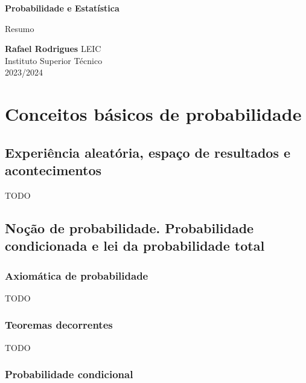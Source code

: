 \documentclass[11pt, a4paper]{article}
\begin{document}
\begin{titlepage}
    \begin{center}
        \vspace*{1cm}

        \textbf{\LARGE Probabilidade e Estatística}
        \vspace{0.5cm}

        \Large Resumo
        \vspace{1.5cm}

        \textbf{Rafael Rodrigues}
        \vfill
        LEIC \\
        Instituto Superior Técnico \\
        2023/2024
    \end{center}
\end{titlepage}

\tableofcontents

\setcounter{section}{1}

\newpage
\section{Conceitos básicos de probabilidade}


\subsection{Experiência aleatória, espaço de resultados e acontecimentos}

TODO

\subsection{Noção de probabilidade. Probabilidade condicionada e lei da probabilidade total}

\subsubsection*{Axiomática de probabilidade}

TODO

\subsubsection*{Teoremas decorrentes}

TODO

\subsubsection*{Probabilidade condicional}
\end{document}
